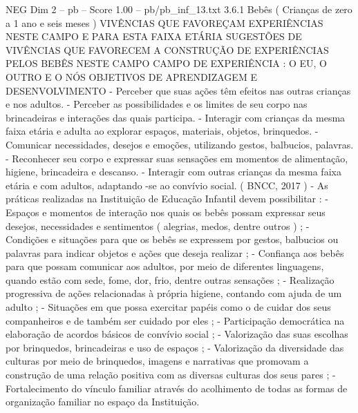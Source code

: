 \begin{textsample}{NEG Dim 2 – pb – Score 1.00 – pb/pb\_inf\_13.txt}  \label{ex:f2_neg_020}
3.6.1 Bebês ( Crianças de zero a 1 ano e seis meses ) VIVÊNCIAS QUE FAVOREÇAM EXPERIÊNCIAS NESTE CAMPO E PARA ESTA FAIXA ETÁRIA SUGESTÕES DE VIVÊNCIAS QUE FAVORECEM A CONSTRUÇÃO DE EXPERIÊNCIAS PELOS BEBÊS NESTE CAMPO CAMPO DE EXPERIÊNCIA : O EU, O OUTRO E O NÓS OBJETIVOS DE APRENDIZAGEM E DESENVOLVIMENTO - Perceber que suas ações têm efeitos nas outras crianças e nos adultos. - Perceber as possibilidades e os limites de seu corpo nas brincadeiras e interações das quais participa. - Interagir com crianças da mesma faixa etária e adulta ao explorar espaços, materiais, objetos, brinquedos. - Comunicar necessidades, desejos e emoções, utilizando gestos, balbucios, palavras. - Reconhecer seu corpo e expressar suas sensações em momentos de alimentação, higiene, brincadeira e descanso. - Interagir com outras crianças da mesma faixa etária e com adultos, adaptando -se ao convívio social. ( BNCC, 2017 ) - As práticas realizadas na Instituição de Educação Infantil devem possibilitar : - Espaços e momentos de interação nos quais os bebês possam expressar seus desejos, necessidades e sentimentos ( alegrias, medos, dentre outros ) ; - Condições e situações para que os bebês se expressem por gestos, balbucios ou palavras para indicar objetos e ações que deseja realizar ; - Confiança aos bebês para que possam comunicar aos adultos, por meio de diferentes linguagens, quando estão com sede, fome, dor, frio, dentre outras sensações ; - Realização progressiva de ações relacionadas à própria higiene, contando com ajuda de um adulto ; - Situações em que possa exercitar papéis como o de cuidar dos seus companheiros e de também ser cuidado por eles ; - Participação democrática na elaboração de acordos básicos de convívio social ; - Valorização das suas escolhas por brinquedos, brincadeiras e uso de espaços ; - Valorização da diversidade das culturas por meio de brinquedos, imagens e narrativas que promovam a construção de uma relação positiva com as diversas culturas dos seus pares ; - Fortalecimento do vínculo familiar através do acolhimento de todas as formas de organização familiar no espaço da Instituição.

\end{textsample}

